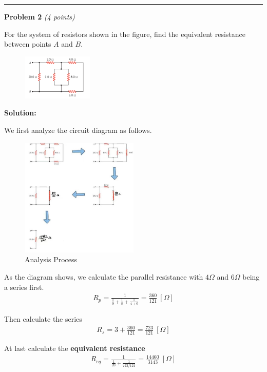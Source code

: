 \documentclass[a4paper, 11pt]{article}
\newenvironment{problem}[3][Problem]
    { \begin{mdframed}[backgroundcolor=gray!20] \textbf{#1 #2} \textit{(#3 points)} }
    {  \end{mdframed}}
\newenvironment{solution}
    {\textbf{Solution:}}
    {}
\begin{document}
\noindent\rule{7.1in}{2.8pt}

\begin{problem}{2}{4}
\par For the system of resistors shown in the figure, find the equivalent resistance between points $A$ and $B$.
\end{problem}
\begin{figure}[!htbp]
	\centering
	\includegraphics[width=0.3\textwidth]{hw5_p2_question.png}
	\label{fig:p2}
\end{figure}

\begin{solution}
	\par We first analyze the circuit diagram as follows.
	\begin{figure}[!htbp]
		\centering
		\includegraphics[width=0.5\textwidth]{hw5_p2_circuit.jpg}
		\caption{Analysis Process}
		\label{fig:circuit}
	\end{figure}

	As the diagram shows, we calculate the parallel resistance with $4\Omega$ and $6\Omega$ being a series first.
	\begin{align*}
		R_{p} = \frac{1}{\frac{1}{9}+\frac{1}{8}+\frac{1}{4+6}} = \frac{360}{121}\ [\Omega]
	\end{align*}

	Then calculate the series
	\begin{align*}
		R_{s} = 3 + \frac{360}{121} = \frac{723}{121} \ [\Omega]
	\end{align*}

	At last calculate the \textbf{equivalent resistance}
	\begin{align}
		R_{eq} = \frac{1}{\frac{1}{20}+\frac{1}{723/121}} = \frac{14460}{3143}\ [\Omega]
	\end{align}
\end{solution}
\end{document}
